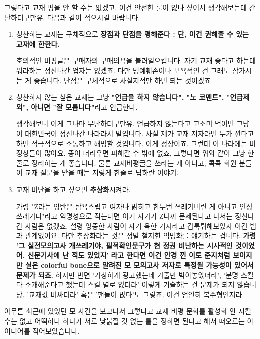 그렇다고 교재 평을 안 할 수는 없겠고.
이건 안전한 룰이 없나 싶어서 생각해보는데 간단하더구만유.
다음과 같이 적으시길 바랍니다.
\vspace{5mm}
\begin{enumerate}

    \item   칭찬하는 교재는 구체적으로 \textbf{장점과 단점을 평해준다 : 단, 이건 권해줄 수 있는 교재에 한한다.}
    \vspace{5mm}

    호의적인  비평글은 구매자의 구매의욕을 불러일으킵니다.
    자기 교재  좋다고 하는데 뭐라하는 정신나간 업자는 없겠죠.
    다만 명예훼손이나 모욕적인 건 그래도 삼가시는 게 좋습니다. 단점은 구체적으로 사실지적만 하면 되는 것이겠죠
    \vspace{5mm}

    \item 칭찬하지 않는 싶은 교재는 그냥 \textbf{"언급을 하지 않습니다", "노 코멘트", "언급제외", 아니면 "잘 모릅니다"}라고 언급한다.
    \vspace{5mm}

    생각해보니 이게 그나마 무난하더구만유. 언급하지 않는다고 고소미 먹이면 그냥 이 대한민국이 정신나간 나라라서 말입니다.
    사실 제가 교재 저자라면 누가 깐다고 하면 적극적으로 소통하고 해명할 것입니다. 이게 정상이죠.
    그런데 이 나라에는 비정상들이 많아요. 똥이 더러우면 피해갈 수 밖에 없죠, 그렇다면 위와 같이 그냥 한줄로 정리하는 게 좋습니다.
    물론 교재비평글을 쓰라는 게 아니고, 콕콕 회원 분들이 교재 질문을 받을 때는 저렇게 한줄로 답하란 이야기.
    \vspace{5mm}

    \item 교재 비난을 하고 싶으면 \textbf{추상화}시켜라.
    \vspace{5mm}

    가령 "Z라는 양반은 탐욕스럽고 여자나 밝히고 한두번 쓰레기버린 게 아니고 인성 쓰레기다"라고 익명성으로 적는다면
    이거 자기가 Z니까 문제된다고 나서는 정신나간 사람은 없겠죠. 설령 엉뚱한 사람이 자기 욕한 거지라고 갑툭튀해보았자 이건 법과 관계없어요.
    다만 추상화라는 것은 정말 철저한 익명화를 얘기하는 겁니다.
    \textbf{가령 '그 실전모의고사 개쓰레기야, 필적확인문구가 현 정권 비난하는 시사적인 것이었어. 신문기사에 난 적도 있었지'}
    \textbf{라고 한다면 이건 안경 낀 이토 준지처럼 보이지만 실은 colorful bone으로 알려진 모 모의고사 저자로 특정될 가능성이 있어서 문제가 되죠.}
    하지만 반면 '거창하게 광고했는데 기출만 박아놓았더라', '분명 스킬 다 소개해준다고 했는데 스킬 별로 없더라'
    이렇게 기술하는 건 문제가 되지 않습니당. '교재값 비싸더라' 혹은 '팬들이 많다'도 그렇죠. 이건 엄연히 복수형인지라.
    \vspace{5mm}
        
        
\end{enumerate}
아무튼 최근에 있었던 모 사건을 보고나서 그렇다고 교재 비평 문화를 활성화 안 시킬 수는 없고 어떡하나 하다가
서로 낯붉힐 것 없는 룰을 정하면 된다고 해서 떠오르는 아이디어를 적어보았습니다.
\vspace{5mm}


